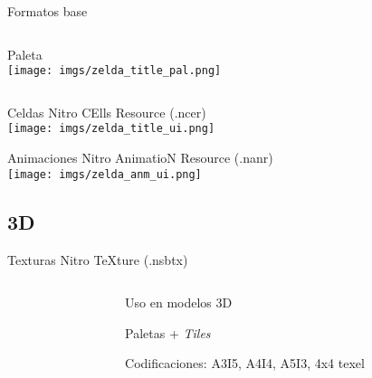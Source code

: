 \begin{frame}{Formatos base}
    \begin{columns}
    \begin{column}{0.45\textwidth}
        \centering{}Paleta \\ \vspace{5pt}
        \texttt{[image: imgs/zelda\_title\_pal.png]}
    \end{column}
    \begin{column}{0.05\textwidth}
    \end{column}
    \begin{column}{0.45\textwidth}
        \centering{} \\ \vspace{5pt}
    \end{column}
    \end{columns}
\end{frame}

\begin{frame}{Celdas}
    \centering{}Nitro CElls Resource (.ncer) \\ \vspace{5pt}
    \texttt{[image: imgs/zelda\_title\_ui.png]}
\end{frame}

\begin{frame}{Animaciones}
    \centering{}Nitro AnimatioN Resource (.nanr) \\ \vspace{5pt}
    \texttt{[image: imgs/zelda\_anm\_ui.png]}
\end{frame}

\subsection{3D}
\begin{frame}{Texturas}
    \centering{}Nitro TeXture (.nsbtx) \\ \vspace{5pt}
    \begin{columns}
    \begin{column}{0.5\textwidth}
    \end{column}
    \begin{column}{0.6\textwidth}
        \begin{wideitemize}
            \item<1-> Uso en modelos 3D
            \item<2-> Paletas + \textit{Tiles}
            \item<3-> Codificaciones: A3I5, A4I4, A5I3, 4x4 texel
        \end{wideitemize}
    \end{column}
    \end{columns}
\end{frame}


